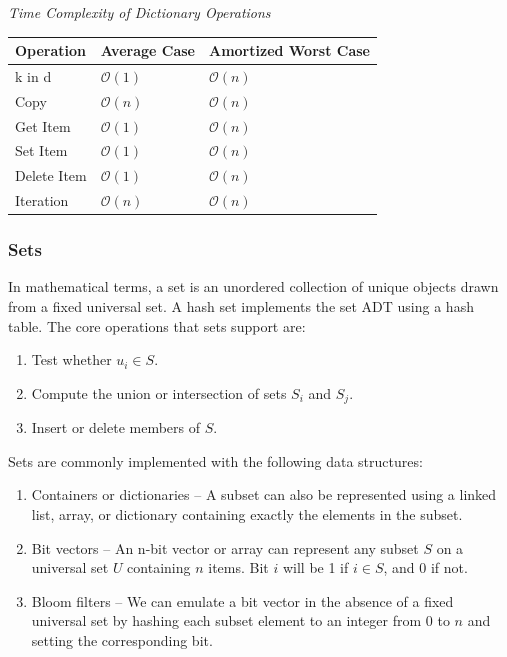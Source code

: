 \documentclass{article}
\newcommand{\bigO}{\mathcal{O}}
\begin{document}
   \vspace{8pt} \emph{Time Complexity of Dictionary Operations}
    \begin{table}[H]
        \begin{tabular}{|l|l|l|}
            \hline
            \textbf{Operation} & \textbf{Average Case} & \textbf{Amortized Worst Case} \\
            \hline
            k in d & $\bigO(1)$ & $\bigO(n)$ \\
            Copy & $\bigO(n)$ & $\bigO(n)$ \\
            Get Item & $\bigO(1)$ & $\bigO(n)$ \\
            Set Item & $\bigO(1)$ & $\bigO(n)$ \\
            Delete Item & $\bigO(1)$ & $\bigO(n)$ \\
            Iteration & $\bigO(n)$ & $\bigO(n)$ \\
            \hline
        \end{tabular}
    \end{table}
    
    \subsubsection{Sets}
    In mathematical terms, a set is an unordered collection of unique objects drawn from a fixed universal set. A hash set implements the set ADT using a hash table. The core operations that sets support are:
    
    \begin{enumerate}
        \item Test whether $u_i \in S$.
        \item Compute the union or intersection of sets $S_i$ and $S_j$.
        \item Insert or delete members of $S$.
    \end{enumerate}
    
    Sets are commonly implemented with the following data structures:
    
    \begin{enumerate}
        \item Containers or dictionaries – A subset can also be represented using a linked list, array, or dictionary containing exactly the elements in the subset.
        \item Bit vectors – An n-bit vector or array can represent any subset $S$ on a universal set $U$ containing $n$ items. Bit $i$ will be 1 if $i \in S$, and $0$ if not.
        \item Bloom filters – We can emulate a bit vector in the absence of a fixed universal set by hashing each subset element to an integer from $0$ to $n$ and setting the corresponding bit.
    \end{enumerate}
    
\end{document}
